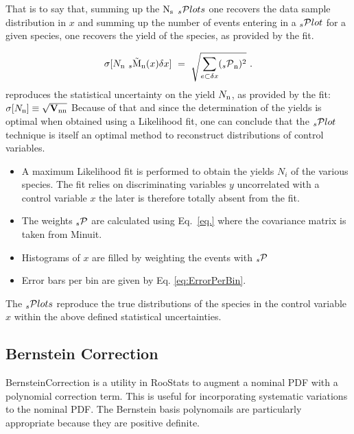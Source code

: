 \documentclass[11pt]{article}
\begin{document}
That is to say that, summing up the 
 ${\rm N}_{\rm s}$
$\hbox {$_s$}{\cal P}lots$  one recovers the data sample distribution in $x$  and summing up the number of events entering in a 
 $\hbox{$_s$}{\cal P}lot$
for a given species, one recovers the yield of the species, as provided by the fit.


 \begin{equation}
\sigma[N_{\rm n}\  _s\tilde{\rm M}_{\rm n}(x) {\delta x}]~=~\sqrt{\sum_{e \subset {\delta x}} ({_s{\cal P}}_{\rm n})^2} ~.
\end{equation}
 reproduces the statistical uncertainty on the yield  $N_{\rm n}$, as provided by the fit: 
$\sigma[N_{\rm n}]\equiv\sqrt{\hbox{\bf V}_{{\rm n}{\rm n}}}$ 
Because of that and since the determination of the yields is optimal
when obtained using a Likelihood fit, one can conclude that the
 $\hbox{$_s$}{\cal P}lot$
  technique is itself an optimal method to reconstruct distributions of control variables.



\begin{itemize}

\item A maximum Likelihood fit is performed to obtain the yields $N_i$ of the various species. 
The fit relies on discriminating variables $y$ uncorrelated with a control variable $x$ 
the later is therefore totally absent from the fit. 

 \item The weights ${_s{\cal P}}$ are calculated using Eq.~\ref{eq.} where the covariance matrix is taken from Minuit.

 \item Histograms of $x$ are filled by weighting the events with ${_s{\cal P}}$  

 \item Error bars per bin are given by Eq. \ref{eq:ErrorPerBin}. 
\end{itemize}

The $\hbox {$_s$}{\cal P}lots$ reproduce the true distributions of the species in the control variable $x$  within the above defined statistical uncertainties.





\subsection{Bernstein Correction}


BernsteinCorrection is a utility in RooStats to augment a nominal PDF with a polynomial  correction term.  This is useful for incorporating systematic variations to the nominal PDF.   The Bernstein basis polynomails are particularly appropriate because they are positive definite. 
\end{document}

